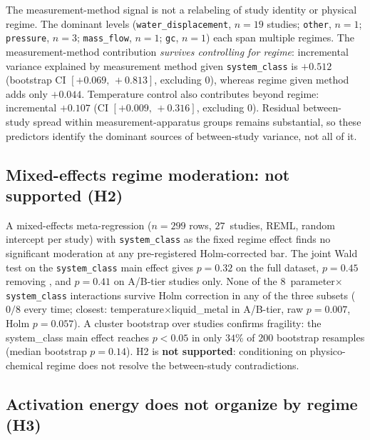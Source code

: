 The measurement-method signal is not a relabeling of study identity or physical regime.
The dominant levels (\texttt{water\_displacement}, $n\!=\!19$ studies;
\texttt{other}, $n\!=\!1$; \texttt{pressure}, $n\!=\!3$; \texttt{mass\_flow}, $n\!=\!1$;
\texttt{gc}, $n\!=\!1$) each span multiple regimes. The measurement-method contribution
\emph{survives controlling for regime}: incremental variance explained by measurement method
given \texttt{system\_class} is $+0.512$ (bootstrap CI $[+0.069,\,+0.813]$,
excluding $0$), whereas regime given method adds only $+0.044$. Temperature control also
contributes beyond regime: incremental $+0.107$ (CI $[+0.009,\,+0.316]$, excluding $0$).
Residual between-study spread within measurement-apparatus groups remains substantial,
so these predictors identify the dominant sources of between-study variance, not all of it.

\subsection{Mixed-effects regime moderation: not supported (H2)}

A mixed-effects meta-regression ($n\!=\!299$ rows, $27$~studies, REML, random intercept
per study) with \texttt{system\_class} as the fixed regime effect finds no significant
moderation at any pre-registered Holm-corrected bar. The joint Wald test on the
\texttt{system\_class} main effect gives $p\!=\!0.32$ on the full dataset,
$p\!=\!0.45$ removing \citeauthor{porciuncula2012}, and $p\!=\!0.41$ on A/B-tier
studies only. None of the $8$~parameter$\times$\texttt{system\_class} interactions
survive Holm correction in any of the three subsets ($0/8$ every time; closest:
temperature$\times$liquid\_metal in A/B-tier, raw $p\!=\!0.007$, Holm $p\!=\!0.057$).
A cluster bootstrap over studies confirms fragility: the system\_class main effect
reaches $p\!<\!0.05$ in only $34\%$ of $200$ bootstrap resamples (median bootstrap
$p\!=\!0.14$). H2 is \textbf{not supported}: conditioning on physico-chemical regime
does not resolve the between-study contradictions.

\subsection{Activation energy does not organize by regime (H3)}

